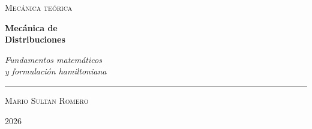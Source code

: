 \begin{pagina}
\thispagestyle{empty}
\centering

\vspace*{2.8cm}

{\large\color{maincolor}\scshape Mecánica teórica}

\vspace{1.6cm}

{\fontsize{34}{40}\selectfont\bfseries\color{darkcolor} Mecánica de\\[0.3cm] Distribuciones}

\vspace{0.9cm}

{\large\itshape Fundamentos matemáticos\\ y formulación hamiltoniana}

\vspace{1.6cm}

\textcolor{maincolor}{\rule{2.4cm}{1.2pt}}

\vfill

{\Large\scshape Mario Sultan Romero}

\vspace{1.2cm}

{\small 2026}

\vspace*{1cm}
\end{pagina}

